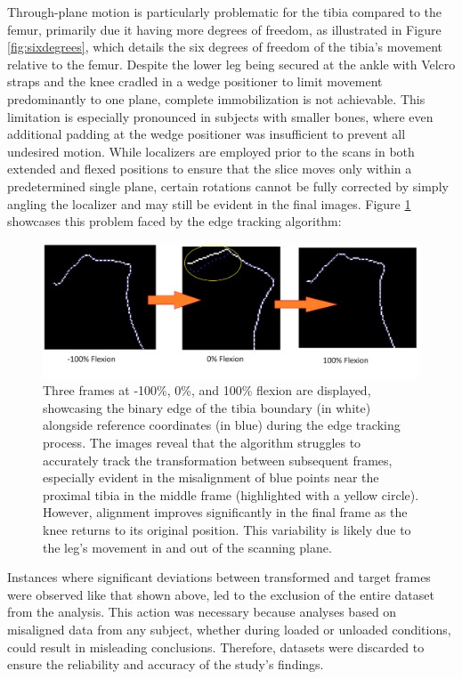 \documentclass{micro-econ-thesis}
\begin{document}
Through-plane motion is particularly problematic for the tibia compared to the femur, primarily due it having more degrees of freedom, as illustrated in Figure \ref{fig:sixdegrees}, which details the six degrees of freedom of the tibia's movement relative to the femur. Despite the lower leg being secured at the ankle with Velcro straps and the knee cradled in a wedge positioner to limit movement predominantly to one plane, complete immobilization is not achievable. This limitation is especially pronounced in subjects with smaller bones, where even additional padding at the wedge positioner was insufficient to prevent all undesired motion. While localizers are employed prior to the scans in both extended and flexed positions to ensure that the slice moves only within a predetermined single plane, certain rotations cannot be fully corrected by simply angling the localizer and may still be evident in the final images. 
Figure \ref{fig:edgebad} showcases this problem faced by the edge tracking algorithm: 

\begin{figure}[H]
	\centering
	\includegraphics[width=0.9\linewidth]{edge_bad_circle}
	\caption{Three frames at -100\%, 0\%, and 100\% flexion are displayed, showcasing the binary edge of the tibia boundary (in white) alongside reference coordinates (in blue) during the edge tracking process. The images reveal that the algorithm struggles to accurately track the transformation between subsequent frames, especially evident in the misalignment of blue points near the proximal tibia in the middle frame (highlighted with a yellow circle). However, alignment improves significantly in the final frame as the knee returns to its original position. This variability is likely due to the leg's movement in and out of the scanning plane.}
	\label{fig:edgebad}
\end{figure}


Instances where significant deviations between transformed and target frames were observed like that shown above, led to the exclusion of the entire dataset from the analysis. This action was necessary because analyses based on misaligned data from any subject, whether during loaded or unloaded conditions, could result in misleading conclusions. Therefore, datasets were discarded to ensure the reliability and accuracy of the study's findings.
\end{document}
